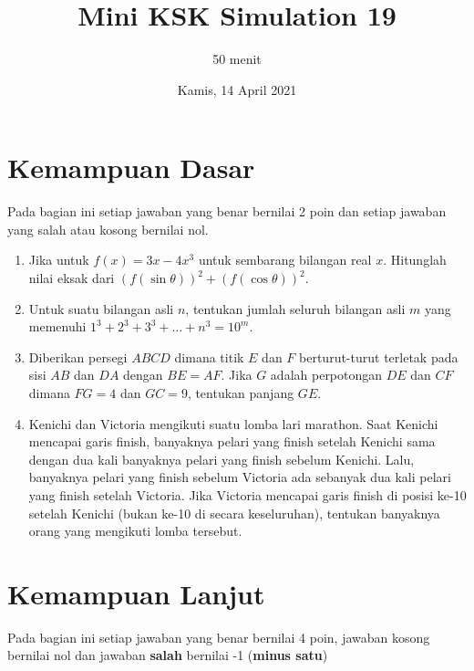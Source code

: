 \documentclass[12pt]{scrartcl}
\title{Mini KSK Simulation 19}
\author{50 menit}
\date{Kamis, 14 April 2021}
\begin{document}
	\maketitle

\renewcommand*\contentsname{Daftar Isi}
\tableofcontents

\newpage
	
	\section{Kemampuan Dasar}
	Pada bagian ini setiap jawaban yang benar bernilai 2 poin dan setiap jawaban yang salah
	atau kosong bernilai nol.
	\begin{enumerate}
		\item Jika untuk $f(x)=3x-4x^3$ untuk sembarang bilangan real $x$. Hitunglah nilai eksak dari $(f(\sin \theta))^2+(f(\cos \theta))^2$.
		
		\item Untuk suatu bilangan asli $n$, tentukan jumlah seluruh bilangan asli $m$ yang memenuhi $1^3+2^3+3^3+\dots+n^3=10^m$.
		
		\item Diberikan persegi $ABCD$ dimana titik $E$ dan $F$ berturut-turut terletak pada sisi $AB$ dan $DA$ dengan $BE=AF$. Jika $G$ adalah perpotongan $DE$ dan $CF$ dimana $FG=4$ dan $GC=9$, tentukan panjang $GE$.
		
		\item Kenichi dan Victoria mengikuti suatu lomba lari marathon. Saat Kenichi mencapai garis finish, banyaknya pelari yang finish setelah Kenichi sama dengan dua kali banyaknya pelari yang finish sebelum Kenichi. Lalu, banyaknya pelari yang finish sebelum Victoria ada sebanyak dua kali pelari yang finish setelah Victoria. Jika Victoria mencapai garis finish di posisi ke-10 setelah Kenichi (bukan ke-10 di secara keseluruhan), tentukan banyaknya orang yang mengikuti lomba tersebut.
	\end{enumerate}

\section{Kemampuan Lanjut}
Pada bagian ini setiap jawaban yang benar bernilai 4 poin, jawaban kosong bernilai nol
dan jawaban \textbf{salah} bernilai -1 (\textbf{minus satu})
\end{document}
